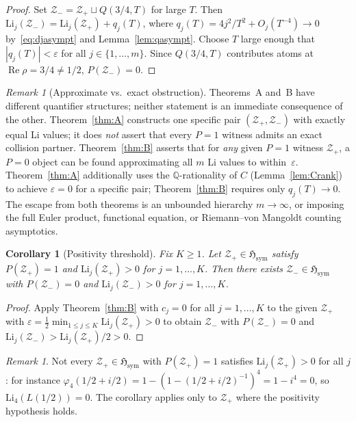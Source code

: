 \documentclass[12pt]{amsart}
\theoremstyle{definition}
\theoremstyle{remark}
\newtheorem{remark}[definition]{Remark}
\theoremstyle{plain}
\newtheorem{corollary}[definition]{Corollary}
\newcommand{\Hsym}{\mathfrak{H}_{\mathrm{sym}}}
\newcommand{\Li}{\mathrm{Li}}
\newcommand{\re}{\operatorname{Re}}
\newcommand{\QQ}{\mathbb{Q}}
\begin{document}
\begin{proof}
Set $\mathcal{Z}_- = \mathcal{Z}_+ \sqcup Q(3/4, T)$ for large $T$.  Then
$\Li_j(\mathcal{Z}_-) = \Li_j(\mathcal{Z}_+) + q_j(T)$, where
$q_j(T) = 4j^2/T^2 + O_j(T^{-4}) \to 0$ by~\eqref{eq:djasympt} and Lemma~\ref{lem:qasympt}.
Choose $T$ large enough that $|q_j(T)| < \varepsilon$ for all $j\in\{1,\ldots,m\}$.
Since $Q(3/4,T)$ contributes atoms at $\re\rho = 3/4 \neq 1/2$,
$P(\mathcal{Z}_-) = 0$.
\end{proof}

\begin{remark}[Approximate vs.\ exact obstruction]
Theorems~A and~B have different quantifier structures; neither statement
is an immediate consequence of the other.  Theorem~\ref{thm:A} constructs one specific pair
$(\mathcal{Z}_+, \mathcal{Z}_-)$ with exactly equal Li values; it does
\emph{not} assert that every $P=1$ witness admits an exact collision partner.
Theorem~\ref{thm:B} asserts that for \emph{any} given $P=1$ witness $\mathcal{Z}_+$,
a $P=0$ object can be found approximating all $m$ Li values to within~$\varepsilon$.
Theorem~\ref{thm:A} additionally uses the $\QQ$-rationality of $C$
(Lemma~\ref{lem:Crank}) to achieve $\varepsilon=0$ for a specific pair;
Theorem~\ref{thm:B} requires only $q_j(T)\to 0$.
The escape from both theorems is an unbounded hierarchy $m\to\infty$,
or imposing the full Euler product, functional equation, or
Riemann--von Mangoldt counting asymptotics.
\end{remark}

\begin{corollary}[Positivity threshold]
\label{cor:B1Li}
Fix $K\ge 1$.
Let $\mathcal{Z}_+ \in \Hsym$ satisfy $P(\mathcal{Z}_+)=1$ and
$\Li_j(\mathcal{Z}_+) > 0$ for $j=1,\ldots,K$.  Then there exists
$\mathcal{Z}_- \in \Hsym$ with $P(\mathcal{Z}_-) = 0$ and
$\Li_j(\mathcal{Z}_-) > 0$ for $j=1,\ldots,K$.
\end{corollary}

\begin{proof}
Apply Theorem~\ref{thm:B} with $c_j = 0$ for all $j = 1,\ldots,K$ to the given
$\mathcal{Z}_+$ with
$\varepsilon = \tfrac12\min_{1\le j\le K}\Li_j(\mathcal{Z}_+) > 0$
to obtain $\mathcal{Z}_-$ with $P(\mathcal{Z}_-)=0$ and
$\Li_j(\mathcal{Z}_-) > \Li_j(\mathcal{Z}_+)/2 > 0$.
\end{proof}

\begin{remark}
Not every $\mathcal{Z}_+\in\Hsym$ with $P(\mathcal{Z}_+)=1$ satisfies
$\Li_j(\mathcal{Z}_+)>0$ for all $j$: for instance
$\varphi_4(1/2+i/2) = 1 - (1-(1/2+i/2)^{-1})^4 = 1 - i^4 = 0$,
so $\Li_4(L(1/2)) = 0$.  The corollary applies only to $\mathcal{Z}_+$
  where the positivity hypothesis holds.
\end{remark}
\end{document}
